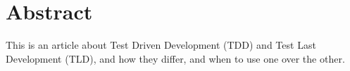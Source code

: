 \section*{Abstract}
\label{section:abstract}
This is an article about Test Driven Development (TDD) and Test Last Development (TLD), and how they differ, and when to use one over the other.



